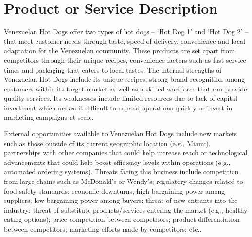 

\section{Product or Service Description}\label{sec:prodservdesc}

Venezuelan Hot Dogs offer two types of hot dogs – ‘Hot Dog 1’ and ‘Hot Dog 2’ – that meet customer needs through taste, speed of delivery, convenience and local adaptation for the Venezuelan community. These products are set apart from competitors through their unique recipes, convenience factors such as fast service times and packaging that caters to local tastes. The internal strengths of Venezuelan Hot Dogs include its unique recipes, strong brand recognition among customers within its target market as well as a skilled workforce that can provide quality services. Its weaknesses include limited resources due to lack of capital investment which makes it difficult to expand operations quickly or invest in marketing campaigns at scale. 

External opportunities available to Venezuelan Hot Dogs include new markets such as those outside of its current geographic location (e.g., Miami), partnerships with other companies that could help increase reach or technological advancements that could help boost efficiency levels within operations (e.g., automated ordering systems). Threats facing this business include competition from large chains such as McDonald’s or Wendy's; regulatory changes related to food safety standards; economic downturns; high bargaining power among suppliers; low bargaining power among buyers; threat of new entrants into the industry; threat of substitute products/services entering the market (e.g., healthy eating options); price competition between competitors; product differentiation between competitors; marketing efforts made by competitors; etc.. 

